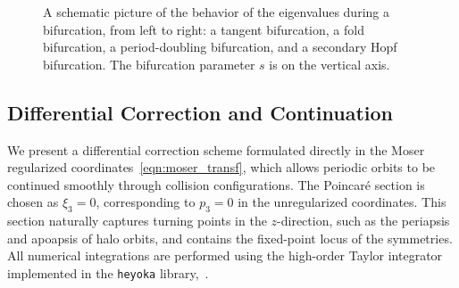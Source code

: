\documentclass[pdflatex,sn-mathphys-ay]{sn-jnl}%
\theoremstyle{thmstyleone}%
\theoremstyle{thmstyletwo}%
\theoremstyle{thmstylethree}%
\begin{document}
\begin{figure}[htb]
    \begin{center}
    \def\svgwidth{1.0\textwidth}%
    \begingroup{}
    \resizebox{0.8\textwidth}{!}{%
    }\endgroup
    \caption{A schematic picture of the behavior of the eigenvalues during a bifurcation, from left to right: a tangent bifurcation, a fold bifurcation, a period-doubling bifurcation, and a secondary Hopf bifurcation. The bifurcation parameter $s$ is on the vertical axis.}
    \label{fig:schematic_bifurcations}
    \end{center}
 
\end{figure}

\subsection{Differential Correction and Continuation}
\label{sec:correction}
We present a differential correction scheme formulated directly in the Moser regularized coordinates~\eqref{eqn:moser_transf}, which allows periodic orbits to be continued smoothly through collision configurations.
The Poincar\'e section is chosen as $\xi_3 = 0$, corresponding to $p_3 = 0$ in the unregularized coordinates. This section naturally captures turning points in the $z$-direction, such as the periapsis and apoapsis of halo orbits, and contains the fixed-point locus of the symmetries.
All numerical integrations are performed using the high-order Taylor integrator implemented in the \texttt{heyoka} library,~\cite{biscani_heyoka_2021}. 
\end{document}
